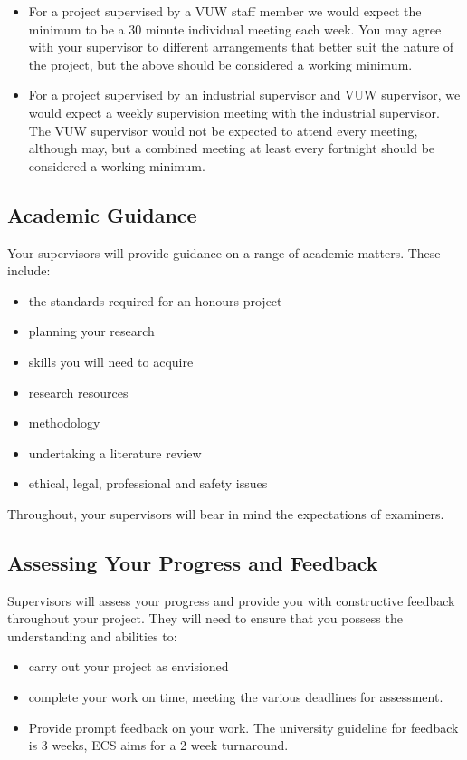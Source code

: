 \begin{itemize}
\item For a project supervised by a VUW staff member we would expect the
minimum to be a 30 minute individual meeting each week.  You may agree
with your supervisor to different arrangements that better suit the
nature of the project, but the above should be considered a working minimum.

\item For a project supervised by an industrial supervisor and VUW
supervisor, we would expect a weekly supervision meeting with the
industrial supervisor.  The VUW supervisor would not be expected to
attend every meeting, although may, but a combined meeting at
least every fortnight should be considered a working minimum.
\end{itemize}

\subsection{Academic Guidance}

Your supervisors will provide guidance on a range of academic matters. These include:

\begin{itemize}
\item the standards required for an honours project
\item planning your research
\item skills you will need to acquire
\item research resources
\item methodology
\item undertaking a literature review
\item ethical, legal, professional and safety issues
\end{itemize}

Throughout, your supervisors will bear in mind the expectations of examiners.

\subsection{Assessing Your Progress and Feedback}

Supervisors will assess your progress and provide you with constructive feedback throughout your project. They will need to ensure that you possess the understanding and abilities to:

\begin{itemize}
\item carry out your project as envisioned
\item complete your work on time, meeting the various deadlines for assessment.
\item Provide prompt feedback on your work.  The university guideline
  for feedback is 3 weeks, ECS aims for a 2 week turnaround.
\end{itemize}


